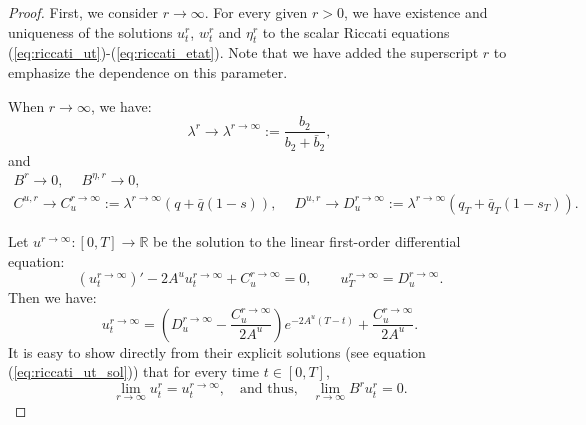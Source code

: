 \documentclass[11pt]{article}
\begin{document}
\begin{proof}
	First, we consider $r \to \infty$. For every given $r >0$, we have existence and uniqueness of the solutions $u^{r}_t$, $w^{r}_t$ and $\eta^{r}_t$ to the scalar Riccati equations (\ref{eq:riccati_ut})-(\ref{eq:riccati_etat}). Note that we have added the superscript $r$ to emphasize the dependence on this parameter. 
	
	When $r \to \infty$, we have:
	\begin{equation*}
		\lambda^r \longrightarrow \lambda^{r\to\infty} := \frac{b_2}{b_2 + \bar{b}_2},
	\end{equation*}
	and
	\begin{equation*}
	\begin{array}{l}
		B^r \longrightarrow 0,\quad \ B^{\eta,r} \longrightarrow 0,\\
		C^{u,r} \longrightarrow C_u^{r\to \infty} := \lambda^{r \to \infty}(q + \bar{q}(1-s)),\quad \ D^{u,r} \to D_u^{r \to \infty} := \lambda^{r \to \infty}(q_T+ \bar{q}_T(1-s_T)).
	\end{array}
	\end{equation*}

	Let $u^{r \to \infty}:[0,T] \to \mathbb{R}$ be the solution to the linear first-order differential equation:
	\begin{equation*}
		\left({u}^{r \to \infty}_t\right)' - 2A^u u_t^{r \to \infty} + C^{r \to \infty}_u = 0, \qquad u_T^{r \to \infty} = D^{r \to \infty}_u.
	\end{equation*}
	Then we have:
	\begin{equation*}
	u_t^{r \to \infty} = \left(D^{r \to \infty}_u - \frac{C^{r \to \infty}_u}{2A^u} \right) e^{-2A^u (T-t)} +  \frac{C^{r \to \infty}_u}{2A^u}.
	\end{equation*}
	It is easy to show directly from their explicit solutions (see equation (\ref{eq:riccati_ut_sol})) that for every time $t\in [0,T]$, $$\lim_{r \to \infty}u^r_t=u^{r \to \infty}_t, \quad \text{and thus,} \quad \lim_{r \to \infty}B^ru^r_t=0.$$
	

\end{proof}
\end{document}
